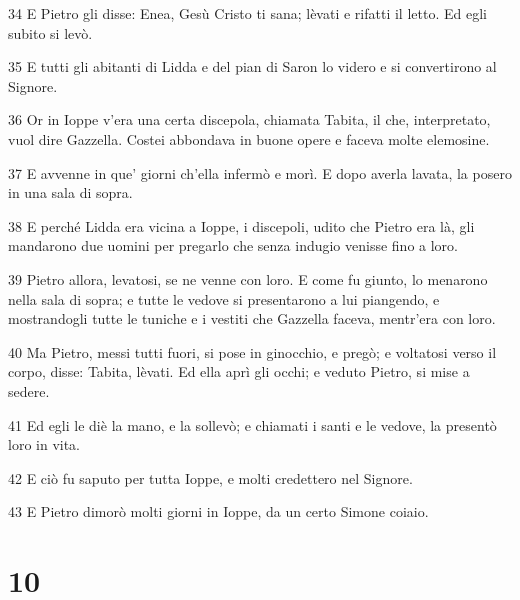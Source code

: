 \par 34 E Pietro gli disse: Enea, Gesù Cristo ti sana; lèvati e rifatti il letto. Ed egli subito si levò.
\par 35 E tutti gli abitanti di Lidda e del pian di Saron lo videro e si convertirono al Signore.
\par 36 Or in Ioppe v'era una certa discepola, chiamata Tabita, il che, interpretato, vuol dire Gazzella. Costei abbondava in buone opere e faceva molte elemosine.
\par 37 E avvenne in que' giorni ch'ella infermò e morì. E dopo averla lavata, la posero in una sala di sopra.
\par 38 E perché Lidda era vicina a Ioppe, i discepoli, udito che Pietro era là, gli mandarono due uomini per pregarlo che senza indugio venisse fino a loro.
\par 39 Pietro allora, levatosi, se ne venne con loro. E come fu giunto, lo menarono nella sala di sopra; e tutte le vedove si presentarono a lui piangendo, e mostrandogli tutte le tuniche e i vestiti che Gazzella faceva, mentr'era con loro.
\par 40 Ma Pietro, messi tutti fuori, si pose in ginocchio, e pregò; e voltatosi verso il corpo, disse: Tabita, lèvati. Ed ella aprì gli occhi; e veduto Pietro, si mise a sedere.
\par 41 Ed egli le diè la mano, e la sollevò; e chiamati i santi e le vedove, la presentò loro in vita.
\par 42 E ciò fu saputo per tutta Ioppe, e molti credettero nel Signore.
\par 43 E Pietro dimorò molti giorni in Ioppe, da un certo Simone coiaio.

\chapter{10}

